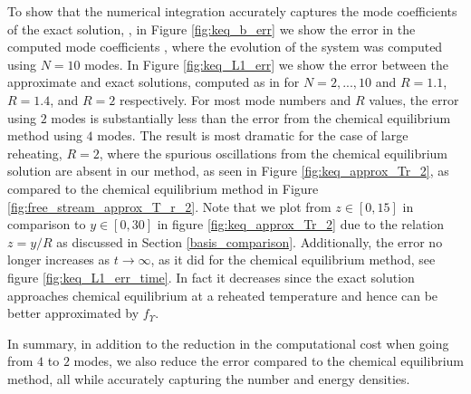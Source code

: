 To show that the numerical integration accurately captures the mode coefficients of the exact solution, , in Figure \ref{fig:keq_b_err} we show the error in the computed mode coefficients , where the evolution of the system was computed using $N=10$ modes. In Figure \ref{fig:keq_L1_err} we show the error between the approximate and exact solutions, computed as in  for $N=2,...,10$ and $R=1.1$, $R=1.4$, and $R=2$ respectively.  For most mode numbers and $R$ values, the error using $2$ modes is substantially less than the error from the chemical equilibrium method using $4$ modes.  The result is most dramatic for the case of large reheating, $R=2$, where the spurious oscillations from the chemical equilibrium solution are absent in our method, as seen in Figure \ref{fig:keq_approx_Tr_2}, as compared to the chemical equilibrium method in Figure \ref{fig:free_stream_approx_T_r_2}.  Note that we plot from $z\in [0,15]$ in comparison to $y\in[0,30]$ in figure \ref{fig:keq_approx_Tr_2} due to the relation $z=y/R$ as discussed in Section \ref{basis_comparison}. Additionally, the error no longer increases as $t\rightarrow\infty$, as it did for the chemical equilibrium method, see figure \ref{fig:keq_L1_err_time}.  In fact it decreases since the exact solution approaches chemical equilibrium at a reheated temperature and hence can be better approximated by $f_\Upsilon$. 

In summary, in addition to the reduction in the computational cost when going from $4$ to $2$ modes, we also reduce the error compared to the chemical equilibrium method, all while accurately capturing the number and energy densities. 

